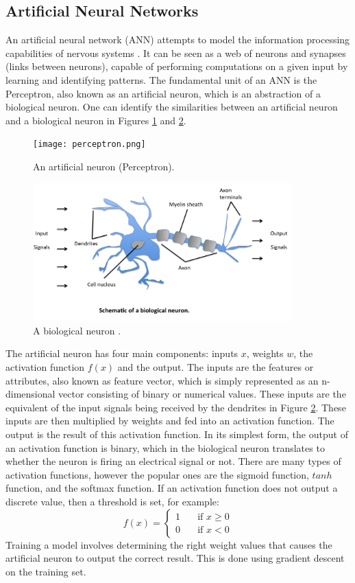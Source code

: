 \documentclass{UoYCSproject}
\begin{document}
\subsection{Artificial Neural Networks}
An artificial neural network (ANN) attempts to model the information processing capabilities of nervous systems \cite{rojas2013neural}. It can be seen as a web of neurons and synapses (links between neurons), capable of performing computations on a given input by learning and identifying patterns. The fundamental unit of an ANN is the Perceptron, also known as an artificial neuron, which is an abstraction of a biological neuron. One can identify the similarities between an artificial neuron and a biological neuron in Figures \ref{fig:artificialneuron} and \ref{fig:biologicalneuron}.  

\begin{figure}[h]
\texttt{[image: perceptron.png]}
\centering
\caption{An artificial neuron (Perceptron).} 
\label{fig:artificialneuron}
\end{figure}

\begin{figure}[h]
\includegraphics[width=10cm]{perceptron_neuron.png}
\centering
\caption{A biological neuron \cite{neuron}.} 
\label{fig:biologicalneuron}
\end{figure}

The artificial neuron has four main components: inputs $x$, weights $w$, the activation function $f(x)$ and the output. The inputs are the features or attributes, also known as feature vector, which is simply represented as an n-dimensional vector consisting of binary or numerical values. These inputs are the equivalent of the input signals being received by the dendrites in Figure \ref{fig:biologicalneuron}. These inputs are then multiplied by weights and fed into an activation function. The output is the result of this activation function. In its simplest form, the output of an activation function is binary, which in the biological neuron translates to whether the neuron is firing an electrical signal or not. There are many types of activation functions, however the popular ones are the sigmoid function, $tanh$ function, and the softmax function. If an activation function does not output a discrete value, then a threshold is set, for example:  \[ f(x) =
  \begin{cases}
    1       & \quad \text{if } x \geq 0\\
    0       & \quad \text{if } x < 0
  \end{cases}
\]
Training a model involves determining the right weight values that causes the artificial neuron to output the correct result. This is done using gradient descent on the training set. 
\end{document}
